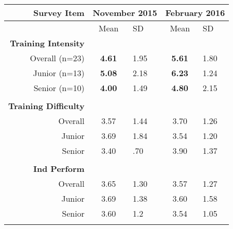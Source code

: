 
\begin{table}[]
\centering
\begin{tabular}{@{}rclcl@{}}
\toprule
Survey Item                  & \multicolumn{2}{l}{November 2015} & \multicolumn{2}{l}{February 2016} \\ \midrule
\multicolumn{1}{c}{}         & Mean                    & SD      & Mean                    & SD      \\
\textbf{Training Intensity}  & \multicolumn{1}{l}{}    &         & \multicolumn{1}{l}{}    &         \\
Overall (n=23)               & \textbf{4.61}                   & 1.95    & \textbf{5.61}                    & 1.80    \\
Junior (n=13)                & \textbf{5.08}           & 2.18    & \textbf{6.23}           & 1.24    \\
Senior (n=10)                & \textbf{4.00}           & 1.49    & \textbf{4.80}           & 2.15    \\
\multicolumn{1}{l}{}         &                         &         &                         &         \\
\textbf{Training Difficulty} &                         &         &                         &         \\
Overall                      & 3.57                    & 1.44    & 3.70                    & 1.26    \\
Junior                       & 3.69                    & 1.84    & 3.54                    & 1.20    \\
Senior                       & 3.40                    & .70     & 3.90                    & 1.37    \\
\multicolumn{1}{l}{}         &                         &         & \multicolumn{1}{l}{}    &         \\
\textbf{Ind Perform}         &                         &         & \multicolumn{1}{l}{}    &         \\
Overall                      & 3.65                    & 1.30    & 3.57                    & 1.27    \\
Junior                       & 3.69                    & 1.38    & 3.60                    & 1.58    \\
Senior                       & 3.60                    & 1.2     & 3.54                    & 1.05    \\
\multicolumn{1}{l}{}         &                         &         & \multicolumn{1}{l}{}    &         \\

\end{tabular}
\end{table}

